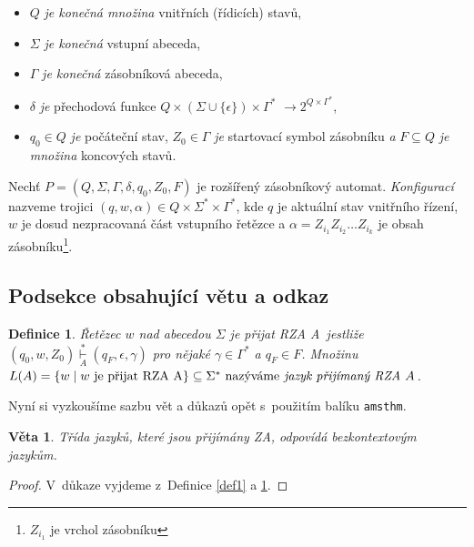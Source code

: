 \documentclass[a4paper, 11pt, twocolumn]{article}
\newtheorem{definice}{Definice}
\newtheorem{veta}{Věta}
\begin{document}
    \renewcommand{\labelitemi}{$\bullet$}
    \begin{itemize}
        \item $Q$ \emph{je konečná množina} vnitřních (řídicích) stavů,
        \item $\Sigma$ \emph{je konečná} vstupní abeceda,
        \item $\Gamma$ \emph{je konečná} zásobníková abeceda,
        \item $\delta$ \emph{je} přechodová funkce
        $Q \times (\Sigma\cup\{\epsilon\}) \times \Gamma^{\ast}$
        $\rightarrow 2^{Q\times\Gamma^{\ast}}$,
        \item $q_0 \in Q$ \emph{je} počáteční stav, $Z_0 \in \Gamma$ \emph{je} startovací
        symbol zásobníku \emph{a} $F \subseteq Q$ \emph{je množina} koncových stavů.
    \end{itemize}

    Nechť $P=(Q, \Sigma, \Gamma, \delta, q_0, Z_0, F)$ je rozšířený zásobníkový
    automat. \emph{Konfigurací} nazveme trojici
    $(q, w, \alpha) \in Q \times \Sigma^{\ast} \times \Gamma^\ast$, kde $q$ je aktuální stav
    vnitřního řízení, $w$ je dosud nezpracovaná část vstupního řetězce a
    $\alpha = Z_{i_1}Z_{i_2}\dots Z_{i_k}$ je obsah
    zásobníku\footnote[1]{$Z_{i_1}$ je vrchol zásobníku}.


    \subsection{Podsekce obsahující větu a odkaz}
    \begin{definice}
        \label{def2}
        \emph{Řetězec $w$ nad abecedou $\Sigma$ je přijat RZA}
        A~jestliže $(q_0, w, Z_0) \overset{*}{\underset{A}\vdash}
        (q_F, \epsilon, \gamma)$ pro nějaké $\gamma \in \Gamma^{\ast}$ a
        $q_F\!\in\!F$. Množinu $L(A) = \{w \mid w \text{ je přijat RZA A} \} \subseteq
        \Sigma^{\ast} \text{ nazýváme} \emph{ jazyk přijímaný RZA } A$.
    \end{definice}

    Nyní si vyzkoušíme sazbu vět a důkazů opět s~použitím balíku \texttt{amsthm}.
    \begin{veta}
        Třída jazyků, které jsou přijímány ZA, odpovídá \emph{bezkontextovým jazykům}.
    \end{veta}
    \begin{proof}
        V~důkaze vyjdeme z~Definice \ref{def1} a \ref{def2}.
    \end{proof}
\end{document}

